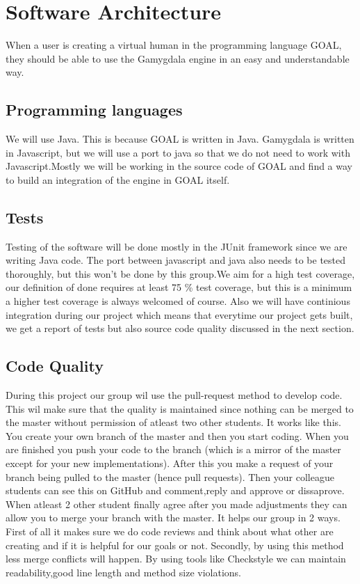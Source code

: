 \documentclass[]{article}
\begin{document}
\section{Software Architecture}
When a user is creating a \gls{virtual human} in the programming language GOAL, they should be able to use the Gamygdala engine in an easy and understandable way.
\subsection{Programming languages}
We will use Java. This is because GOAL is written in Java.
Gamygdala is written in Javascript, but we will use a port to java so that we do not need to work with Javascript.Mostly we will be working in the source code of GOAL and find a way to build an integration of the engine in GOAL itself.
\subsection{Tests}
Testing of the software will be done mostly in the \gls{JUnit} framework since we are writing Java code. The port between javascript and java also needs to be tested thoroughly, but this won't be done by this group.We aim for a high test coverage, our definition of done requires at least 75 \% test coverage, but this is a minimum a higher test coverage is always welcomed of course. Also we will have continious integration during our project which means that everytime our project gets built, we get a report of tests but also source code quality discussed in the next section.

\subsection{Code Quality}
During this project our group wil use the pull-request method to develop code. This wil make sure that the quality is maintained since nothing can be merged to the \gls{master} without permission of atleast two other students. It works like this. You create your own branch of the master and then you start coding. When you are finished you push your code to the branch (which is a mirror of the master except for your new implementations). After this you make a request of your branch being pulled to the master (hence pull requests). Then your colleague students can see this on GitHub and comment,reply and approve or dissaprove. When atleast 2 other student finally agree after you made adjustments they can allow you to merge your branch with the master. It helps our group in 2 ways. First of all it makes sure we do code reviews and think about what other are creating and if it is helpful for our goals or not. Secondly, by using this method less merge conflicts will happen.
By using tools like Checkstyle we can maintain readability,good line length and method size violations.
\end{document}
